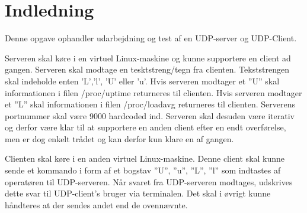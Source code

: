 \chapter{Indledning}\label{ch:introduction}
Denne opgave ophandler udarbejdning og test af en UDP-server og UDP-Client. 

\noindent Serveren skal køre i en virtuel Linux-maskine og kunne supportere en client ad gangen. Serveren skal modtage en tesktstreng/tegn fra clienten. Tekststrengen skal indeholde enten 'L','l', 'U' eller 'u'. Hvis serveren modtager et ”U” skal informationen i filen /proc/uptime
returneres til clienten. 
Hvis serveren modtager et ”L” skal informationen i filen /proc/loadavg returneres til clienten.
Serverens portnummer skal være 9000 hardcoded ind. 
Serveren skal desuden være iterativ og derfor være klar til at supportere en anden client efter en endt overførelse, men er dog enkelt trådet og kan derfor kun klare en af gangen.

\noindent Clienten skal køre i en anden virtuel Linux-maskine. Denne client skal kunne sende et kommando i form af et 
bogstav ”U”, ”u”, ”L”, ”l” som indtastes af operatøren
til UDP-serveren. Når svaret fra UDP-serveren modtages, udskrives dette svar til UDP-client’s bruger via terminalen. Det skal i øvrigt kunne håndteres at der sendes andet end de ovennævnte.  